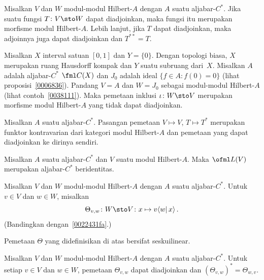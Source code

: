 \begin{prop} Misalkan $V$ dan $W$ modul-modul Hilbert-$A$ dengan $A$ suatu aljabar-$C^*$. Jika suatu
fungsi $T\colon V \sto W$ dapat diadjoinkan, maka fungsi itu merupakan morfisme modul Hilbert-$A$.
Lebih lanjut, jika $T$ dapat diadjoinkan, maka adjoinnya juga dapat diadjoinkan dan $T^{**} = T$.
\end{prop}

\begin{exam} Misalkan $X$ interval satuan $[0,1]$ dan $Y = \{0\}$. Dengan topologi biasa,
$X$ merupakan ruang Hausdorff kompak dan $Y$ suatu subruang dari~$X$. Misalkan $A$ adalah
aljabar-$C^*$ $\fml C(X)$ dan $J_0$ adalah ideal $\{f \in A\colon f(0) = 0\}$ (lihat
proposisi~\ref{0006836}). Pandang $V = A$ dan $W = J_0$ sebagai modul-modul Hilbert-$A$ (lihat
contoh~\ref{0038111}). Maka pemetaan inklusi
$\iota\colon W \sto V$ merupakan morfisme modul Hilbert-$A$ yang tidak dapat diadjoinkan.
\end{exam}

\begin{prop} Misalkan $A$ suatu aljabar-$C^*$. Pasangan pemetaan $V \mapsto V$, $T \mapsto T^*$
merupakan funktor kontravarian dari kategori modul Hilbert-$A$ dan pemetaan yang dapat diadjoinkan
ke dirinya sendiri.
\end{prop}

\begin{prop}\label{0038244} Misalkan $A$ suatu aljabar-$C^*$ dan $V$ suatu modul Hilbert-$A$.
Maka $\ofml L(V)$ merupakan aljabar-$C^*$ beridentitas.
\end{prop}

\begin{notn} Misalkan $V$ dan $W$ modul-modul Hilbert-$A$ dengan $A$ suatu aljabar-$C^*$.
Untuk $v \in V$ dan $w \in W$, misalkan
  \[ \Theta_{v,w}\colon W \sto V\colon x \mapsto v\langle w \vert\, x\rangle\,. \]
(Bandingkan dengan~\ref{0022431fa}.)
\end{notn}

\begin{prop} Pemetaan $\Theta$ yang didefinisikan di atas bersifat seskuilinear.
\end{prop}

\begin{prop} Misalkan $V$ dan $W$ modul-modul Hilbert-$A$ dengan $A$ suatu aljabar-$C^*$. Untuk
setiap $v \in V$ dan $w \in W$, pemetaan $\Theta_{v,w}$ dapat diadjoinkan dan $(\Theta_{v,w})^*
= \Theta_{w,v}$.
\end{prop}

